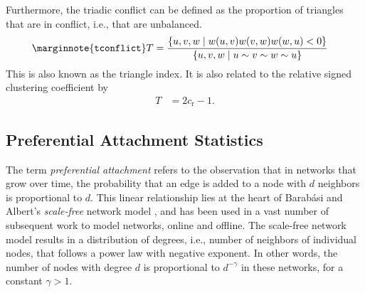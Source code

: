 \documentclass{article}
\begin{document}
Furthermore, the triadic conflict can be defined as the proportion of
triangles that are in conflict, i.e., that are unbalanced. 
\begin{align}
  \marginnote{\texttt{tconflict}}  
  T &= \frac 
  {\{ u, v, w \mid w(u, v) w(v, w) w(w, u) < 0\}}
  {\{ u, v, w \mid u \sim v \sim w \sim u \}}
\end{align}
This is also known as the triangle index.
It is also related to the relative signed clustering coefficient by
\begin{align*}
T &= 2 c_{\mathrm r} - 1.
\end{align*}

\subsection{Preferential Attachment Statistics}
The term \emph{preferential attachment} refers to the observation that
in networks that grow over time, the probability that an edge is added
to a node with $d$ neighbors is proportional to $d$.  This linear
relationship lies at the heart of Barabási and Albert's
\emph{scale-free} network model \cite{b439}, and has been used in a vast
number of subsequent work to model networks, online and offline. The
scale-free network model results in a distribution of degrees, i.e.,
number of neighbors of individual nodes, that follows a power law with
negative exponent. In other words, the number of nodes with degree $d$ is
proportional to $d^{-\gamma}$ in these networks, for a constant
$\gamma>1$.
\end{document}
